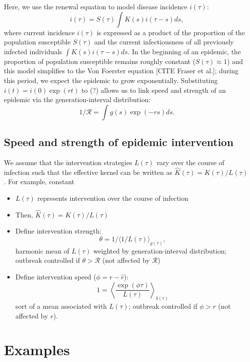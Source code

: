 \documentclass{article}\usepackage[]{graphicx}\usepackage[]{color}
\newcommand{\RR}{\ensuremath{{\mathcal R}}}
\begin{document}
Here, we use the renewal equation to model disease incidence $i(\tau)$:
\begin{equation}
i(\tau) = S(\tau) \int K(s) i(\tau-s) ds,
\end{equation}
where current incidence $i(\tau)$ is expressed as a product of the proportion 
of the population susceptible $S(\tau)$ and the current infectiousness of all 
previously infected individuals $\int K(s) i(\tau - s) ds$. In the beginning 
of an epidemic, the proportion of population susceptible remains roughly 
constant ($S(\tau) \approx 1$) and this model simplifies to the Von Foerster 
equation [CITE Fraser et al.]; during this period, we expect the epidemic 
to grow exponentially. Substituting $i(t) = i(0) \exp(rt)$ to (?) allows us 
to link speed and strength of an epidemic via the generation-interval distribution:
\begin{equation}
1/\RR = \int g(s) \exp(-rs) ds.
\end{equation}

\subsection{Speed and strength of epidemic intervention}

We assume that the intervention strategies $L(\tau)$ vary over the course 
of infection such that the effective kernel can be written as 
$\hat K(\tau) = K(\tau)/L(\tau)$. For example, constant 


\begin{itemize}
	\item $L(\tau)$ represents intervention over the course of infection
	\item Then, $\hat K(\tau) = K(\tau)/L(\tau)$
	\item Define intervention strength:
	$$
	\theta = 1/\langle 1/L(\tau) \rangle_{g(\tau)},
	$$
	harmonic mean of $L(\tau)$ weighted by generation-interval distribution; outbreak controlled if $\theta > \mathcal R$ (not affected by $\RR$)
	\item Define intervention speed ($\phi = r - \hat r$):
	$$
	1 = \left\langle \frac{\exp(\phi \tau) }{L(\tau)} \right\rangle_{b(\tau)}
	$$
	sort of a mean associated with $L(\tau)$; outbreak controlled if $\phi > r$ (not affected by $r$).
\end{itemize}

\section{Examples}
\end{document}
